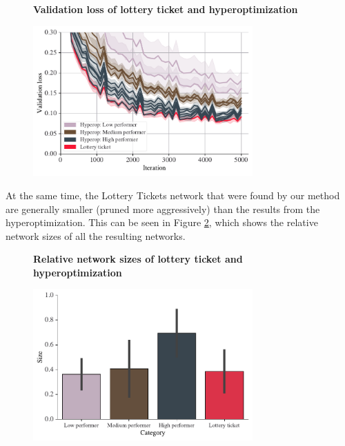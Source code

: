 \documentclass[12pt,final,twoside]{article}
\theoremstyle{plain}
\theoremstyle{definition}
\theoremstyle{remark}
\theoremstyle{named}
\begin{document}
\begin{figure}[h]
  \centering
  \textbf{Validation loss of lottery ticket and hyperoptimization}\par\medskip
  \includegraphics[width=0.75\textwidth]{plots/lt-accuracy.pdf}
  \caption{}
  \label{fig:lt-accuracy}
\end{figure}

At the same time, the Lottery Tickets network that were found by our method are generally smaller (pruned more aggressively) than the results from the hyperoptimization. This can be seen in Figure \ref{fig:lt-size}, which shows the relative network sizes of all the resulting networks. 

\begin{figure}[h]
  \centering
  \textbf{Relative network sizes of lottery ticket and hyperoptimization}\par\medskip
  \includegraphics[width=0.75\textwidth]{plots/lt-size.pdf}
  \caption{}
  \label{fig:lt-size}
\end{figure}
\end{document}
